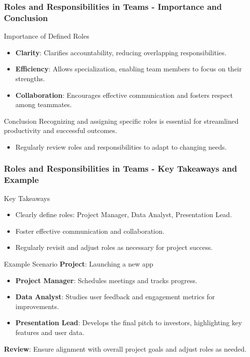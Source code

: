 \documentclass[aspectratio=169]{beamer}
\begin{document}
\begin{frame}[fragile]
    \frametitle{Roles and Responsibilities in Teams - Importance and Conclusion}
    \begin{block}{Importance of Defined Roles}
        \begin{itemize}
            \item \textbf{Clarity}: Clarifies accountability, reducing overlapping responsibilities.
            \item \textbf{Efficiency}: Allows specialization, enabling team members to focus on their strengths.
            \item \textbf{Collaboration}: Encourages effective communication and fosters respect among teammates.
        \end{itemize}
    \end{block}

    \begin{block}{Conclusion}
        Recognizing and assigning specific roles is essential for streamlined productivity and successful outcomes. 
        \begin{itemize}
            \item Regularly review roles and responsibilities to adapt to changing needs.
        \end{itemize}
    \end{block}
\end{frame}

\begin{frame}[fragile]
    \frametitle{Roles and Responsibilities in Teams - Key Takeaways and Example}
    \begin{block}{Key Takeaways}
        \begin{itemize}
            \item Clearly define roles: Project Manager, Data Analyst, Presentation Lead.
            \item Foster effective communication and collaboration.
            \item Regularly revisit and adjust roles as necessary for project success.
        \end{itemize}
    \end{block}

    \begin{block}{Example Scenario}
        \textbf{Project}: Launching a new app
        \begin{itemize}
            \item \textbf{Project Manager}: Schedules meetings and tracks progress.
            \item \textbf{Data Analyst}: Studies user feedback and engagement metrics for improvements.
            \item \textbf{Presentation Lead}: Develops the final pitch to investors, highlighting key features and user data.
        \end{itemize}
        \textbf{Review}: Ensure alignment with overall project goals and adjust roles as needed.
    \end{block}
\end{frame}
\end{document}
